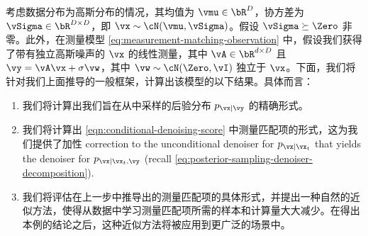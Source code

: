 \documentclass[../../book-main_zh.tex]{subfiles}
\begin{document}
\begin{example}\label{example:denoising-conditional-gaussian}
    考虑数据分布为高斯分布的情况，其均值为 $\vmu \in \bR^D$，协方差为 $\vSigma \in \bR^{D \times D}$，即 $\vx \sim \cN(\vmu, \vSigma)$。假设 $\vSigma \succeq \Zero$ 非零。此外，在测量模型 \eqref{eq:measurement-matching-observation} 中，假设我们获得了带有独立高斯噪声的 $\vx$ 的线性测量，其中 $\vA \in \bR^{d \times D}$ 且 $\vy = \vA \vx + \sigma \vw$，其中 $\vw \sim \cN(\Zero, \vI)$ 独立于 $\vx$。下面，我们将针对我们上面推导的一般框架，计算出该模型的以下结果。具体而言：
    \begin{enumerate}
        \item 我们将计算出我们旨在从中采样的后验分布 $p_{\vx \mid \vy}$ 的精确形式。
        \item 我们将计算出 \eqref{eqn:conditional-denoising-score} 中测量匹配项的形式，这为我们提供了加性
            correction to the unconditional denoiser for $p_{\vx \mid
            \vx_t}$ that
            yields the denoiser for $p_{\vx \mid \vx_t, \vy}$ (recall
            \eqref{eq:posterior-sampling-denoiser-decomposition}).
        \item 我们将评估在上一步中推导出的测量匹配项的具体形式，并提出一种自然的近似方法，使得从数据中学习测量匹配项所需的样本和计算量大大减少。在得出本例的结论之后，这种近似方法将被应用到更广泛的场景中。
    \end{enumerate}


\end{example}
\end{document}
